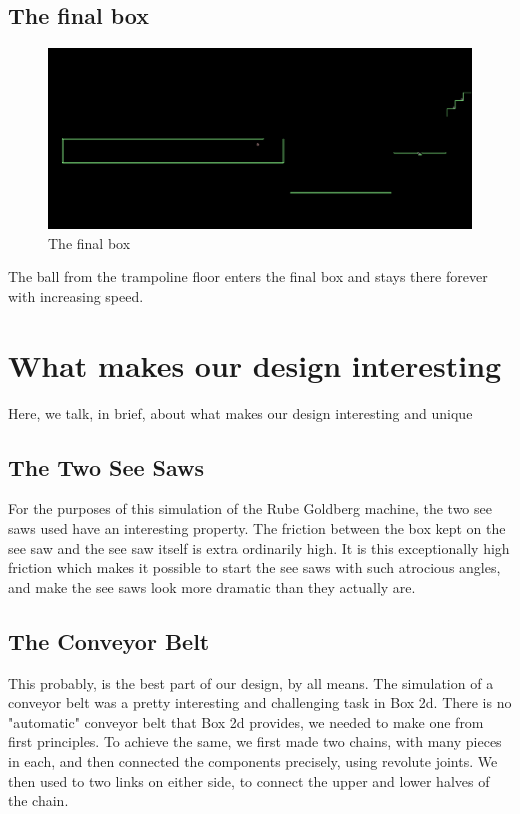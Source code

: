 \documentclass[a4paper,11pt]{article}
\begin{document}
\subsection{The final box}
  	\begin{figure}
	\includegraphics[scale=0.35]{18_inside_box.png}
	\caption{The final box}
	\end{figure}  
	The ball from the trampoline floor enters the final box and stays there forever with increasing speed.

\pagebreak
\section{What makes our design interesting}

Here, we talk, in brief, about what makes our design interesting and unique

\subsection{The Two See Saws}

For the purposes of this simulation of the Rube Goldberg machine, the two see saws used have an interesting property. The friction between the box kept on the see saw and the see saw itself is extra ordinarily high. It is this exceptionally high friction which makes it possible to start the see saws with such atrocious angles, and make the see saws look more dramatic than they actually are.

\subsection{The Conveyor Belt}

This probably, is the best part of our design, by all means. The simulation of a conveyor belt was a pretty interesting and challenging task in Box 2d. There is no "automatic" conveyor belt that Box 2d provides, we needed to make one from first principles. To achieve the same, we first made two chains, with many pieces in each, and then connected the components precisely, using revolute joints.
We then used to two links on either side, to connect the upper and lower halves of the chain.
\end{document}
